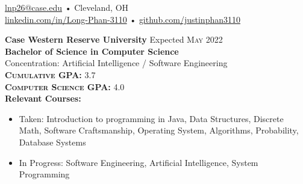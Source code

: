 \documentclass[a4paper,11pt]{article}
\begin{document}
 
 
\begin{center} 
\href{mailto:lnp26@case.edu}{lnp26@case.edu} • Cleveland, OH \\
\href{https://linkedin.com/in/Long-Phan-3110/}{linkedin.com/in/Long-Phan-3110} • \href{http://github.com/justinphan3110}{github.com/justinphan3110}
\noindent\makebox[\linewidth]{\rule{\paperwidth}{2pt}}
\end{center}

\begin{flushleft}
	\textbf{Case Western Reserve University } \hspace{1cm} Expected \textsc{May} 2022 \\
	\textbf{Bachelor of Science in Computer Science} \\
	Concentration: Artificial Intelligence / Software Engineering \\
	\textbf{\textsc{Cumulative GPA:}} 3.7 \\
	\textbf{\textsc{Computer Science GPA:}} 4.0 \\ 
    \textbf{Relevant Courses:} 
    \vspace{-\topsep}
    	\begin{itemize}
    		\setlength{\parskip}{0pt}
    		\setlength{\itemsep}{0pt plus 1pt}
    		\item Taken: Introduction to programming in Java, Data Structures, Discrete Math, Software Craftsmanship, Operating System, Algorithms, Probability, Database Systems 
    		\item In Progress: Software Engineering, Artificial Intelligence, System Programming
        \end{itemize}
    		
	\centering{\noindent\makebox{\rule{8cm}{1.5pt}}}
\end{flushleft}
\end{document}
